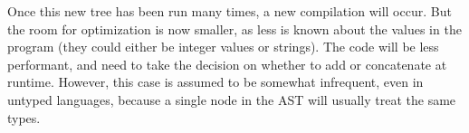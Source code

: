 \documentclass[twoside,11pt,a4paper]{article}
\newcommand{\java}[1]{\textsf{#1}}
\begin{document}
Once this new tree has been run many times, a new compilation will occur. But the room for optimization is now smaller, as less is known about the values in the program (they could either be integer values or strings). The code will be less performant, and need to take the decision on whether to add or concatenate at runtime. However, this case is assumed to be somewhat infrequent, even in untyped languages, because a single node in the AST will usually treat the same types.

%
%
\end{document}
